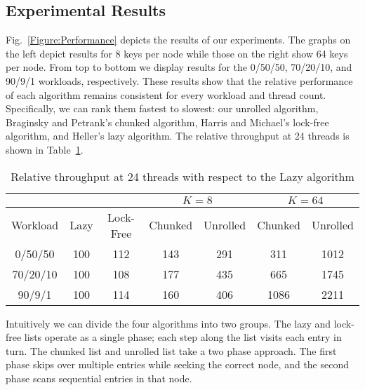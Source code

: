 \documentclass{llncs}
\begin{document}
{\subsection{Experimental Results}
Fig.~\ref{Figure:Performance} depicts the results of our experiments.  The graphs on the
left depict results for 8 keys per node while those on the right show 64 keys per 
node.  From top to bottom we display results for the 0/50/50, 70/20/10, and 90/9/1 workloads,
respectively.  These results show that the relative performance of each algorithm remains
consistent for every workload and thread count.  Specifically, we can rank them fastest to
slowest: our unrolled algorithm, Braginsky and Petrank's chunked algorithm, Harris and Michael's
lock-free algorithm, and Heller's lazy algorithm.  The relative throughput at 24 threads is shown
in Table~\ref{Figure:RelativePerf}.
\begin{table}
\setlength{\tabcolsep}{6pt}
\centering
\begin{tabular}{| c | c | c | c | c | c | c |}
\cline{4-7}
\multicolumn{3}{c}{}&\multicolumn{2}{|c|}{$K = 8$}&\multicolumn{2}{|c|}{$K = 64$}\\
\hline
Workload&Lazy&Lock-Free&Chunked&Unrolled&Chunked&Unrolled\\
\hline
0/50/50&100 & 112 & 143 & 291 & 311 & 1012\\
\hline
70/20/10& 100 & 108 & 177 & 435 & 665 & 1745\\
\hline
90/9/1& 100 & 114 & 160 & 406 & 1086 & 2211\\
\hline
\end{tabular}
\caption{Relative throughput at 24 threads with respect to the Lazy algorithm}
\label{Figure:RelativePerf}
\end{table}

Intuitively we can divide the four algorithms into two groups.  The lazy and lock-free lists
operate as a single phase; each step along the list visits each entry in turn.  The
chunked list and unrolled list take a two phase approach.  The first phase skips over 
multiple entries while seeking the correct node, and the second phase scans sequential entries
in that node.

}
\end{document}
